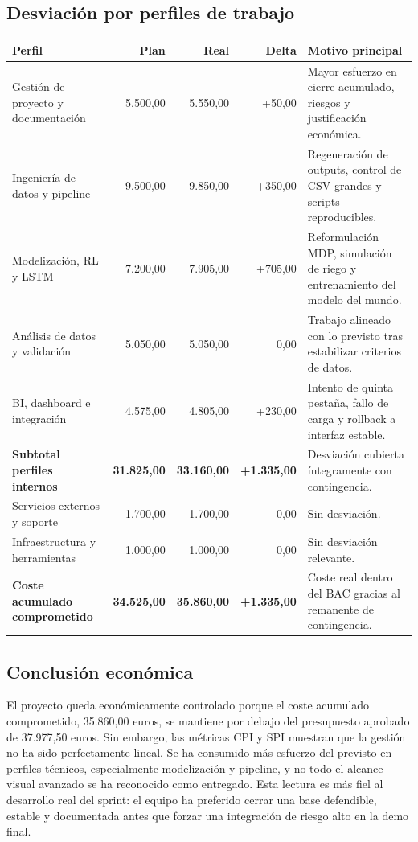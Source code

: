 \documentclass[11pt,a4paper]{article}
\begin{document}
\subsection{Desviación por perfiles de trabajo}

\begin{table}[H]
\centering
\begin{tabular}{p{4cm}r r r p{5cm}}
\toprule
\textbf{Perfil} & \textbf{Plan} & \textbf{Real} & \textbf{Delta} & \textbf{Motivo principal} \\
\midrule
Gestión de proyecto y documentación & 5.500,00 & 5.550,00 & +50,00 & Mayor esfuerzo en cierre acumulado, riesgos y justificación económica. \\
Ingeniería de datos y pipeline & 9.500,00 & 9.850,00 & +350,00 & Regeneración de outputs, control de CSV grandes y scripts reproducibles. \\
Modelización, RL y LSTM & 7.200,00 & 7.905,00 & +705,00 & Reformulación MDP, simulación de riego y entrenamiento del modelo del mundo. \\
Análisis de datos y validación & 5.050,00 & 5.050,00 & 0,00 & Trabajo alineado con lo previsto tras estabilizar criterios de datos. \\
BI, dashboard e integración & 4.575,00 & 4.805,00 & +230,00 & Intento de quinta pestaña, fallo de carga y rollback a interfaz estable. \\
\midrule
\textbf{Subtotal perfiles internos} & \textbf{31.825,00} & \textbf{33.160,00} & \textbf{+1.335,00} & Desviación cubierta íntegramente con contingencia. \\
Servicios externos y soporte & 1.700,00 & 1.700,00 & 0,00 & Sin desviación. \\
Infraestructura y herramientas & 1.000,00 & 1.000,00 & 0,00 & Sin desviación relevante. \\
\midrule
\textbf{Coste acumulado comprometido} & \textbf{34.525,00} & \textbf{35.860,00} & \textbf{+1.335,00} & Coste real dentro del BAC gracias al remanente de contingencia. \\
\bottomrule
\end{tabular}
\end{table}

\subsection{Conclusión económica}

El proyecto queda económicamente controlado porque el coste acumulado comprometido, 35.860,00 euros, se mantiene por debajo del presupuesto aprobado de 37.977,50 euros. Sin embargo, las métricas CPI y SPI muestran que la gestión no ha sido perfectamente lineal. Se ha consumido más esfuerzo del previsto en perfiles técnicos, especialmente modelización y pipeline, y no todo el alcance visual avanzado se ha reconocido como entregado. Esta lectura es más fiel al desarrollo real del sprint: el equipo ha preferido cerrar una base defendible, estable y documentada antes que forzar una integración de riesgo alto en la demo final.
\end{document}
